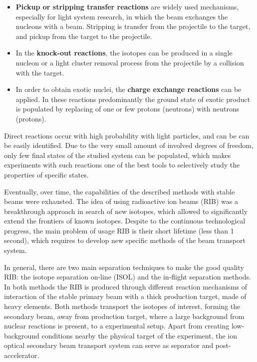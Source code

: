 \begin{itemize}
	
	\item 
	\textbf{Pickup or stripping transfer reactions} are widely used mechanisms, especially for light system research, in which the beam exchanges the nucleons with a beam. 
	Stripping is transfer from the projectile to the target, and pickup from the target to the projectile.
	
	\item
	In the \textbf{knock-out reactions}, the isotopes can be produced in a single nucleon or a light cluster removal process from the projectile by a collision with the target.
	
	\item
	In order to obtain exotic nuclei, the \textbf{charge exchange reactions} can be applied.
	In these reactions predominantly  the ground state of exotic product is populated by replacing of one or few protons (neutrons) with neutrons (protons).
	
	
\end{itemize}	
Direct reactions occur with high probability with light particles, and can be can be easily identified.
Due to the very small amount of involved degrees of freedom, only few final states of the studied system can be populated, which makes experiments with such reactions one of the best tools to selectively study the properties of specific states.

Eventually, over time, the capabilities of the described methods with stable beams were exhausted.
The idea of using radioactive ion beams (RIB) was a breakthrough approach in search of new isotopes, which allowed to significantly extend the frontiers of known isotopes. 
Despite to the continuous technological progress, the main problem of usage RIB is their short lifetime (less than 1 second), which requires to develop new specific methods of the beam transport system.


In general, there are two main separation techniques to make the good quality RIB: the isotope separation on-line (ISOL) and the in-flight separation methods.
In both methods the RIB is produced through different reaction mechanisms of interaction of the stable primary beam with a thick production target, made of heavy elements.
Both methods transport the isotopes of interest, forming the secondary beam, away from production target, where a large background from nuclear reactions is present, to a experimental setup.
Apart from creating low-background conditions nearby the physical target of the experiment, the ion optical secondary beam transport system can serve as separator and post-accelerator.

